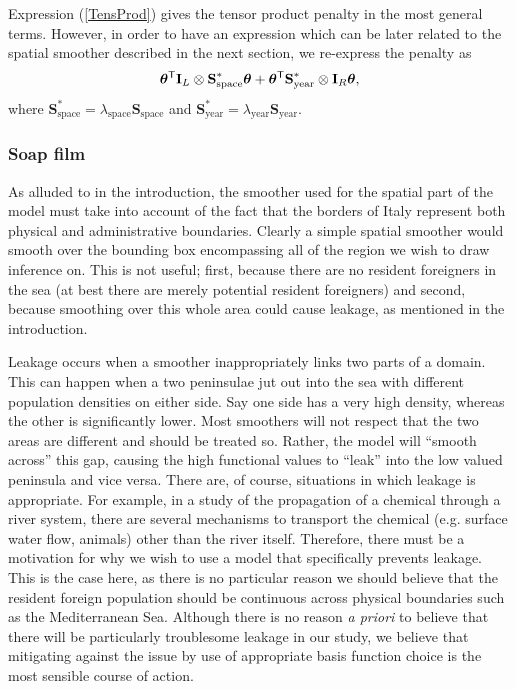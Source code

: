 \documentclass[12pt]{article}
\newcommand{\ts}{^{\sf T}}
\theoremstyle{definition}
\theoremstyle{plain}
\begin{document}
Expression (\ref{TensProd}) gives the tensor product penalty in the most general terms. However, in order to have an expression which can be later related to the spatial smoother described in the next section, we re-express the penalty as
$$
\bm\theta\ts \textbf{I}_L \otimes \textbf{S}^*_\text{space} \bm\theta + \bm\theta\ts \textbf{S}^*_\text{year} \otimes \textbf{I}_R  \bm\theta,
$$
where $\textbf{S}^*_\text{space}=\lambda_\text{space} \textbf{S}_\text{space}$ and $\textbf{S}^*_\text{year}=\lambda_\text{year} \textbf{S}_\text{year}$.


\subsubsection{Soap film \label{SF}}

As alluded to in the introduction, the smoother used for the spatial part of the model must take into account of the fact that the borders of Italy represent both physical and administrative boundaries. Clearly a simple spatial smoother would smooth over the bounding box encompassing all of the region we wish to draw inference on. This is not useful; first, because there are no resident foreigners in the sea (at best there are merely potential resident foreigners) and second, because smoothing over this whole area could cause leakage, as mentioned in the introduction.

Leakage occurs when a smoother inappropriately links two parts of a domain. This can happen when a two peninsulae jut out into the sea with different population densities on either side. Say one side has a very high density, whereas the other is significantly lower. Most smoothers will not respect that the two areas are different and should be treated so. Rather, the model will ``smooth across'' this gap, causing the high functional values to ``leak'' into the low valued peninsula and vice versa. There are, of course, situations in which leakage is appropriate. For example, in a study of the propagation of a chemical through a river system, there are several mechanisms to transport the chemical (e.g. surface water flow, animals) other than the river itself. Therefore, there must be a motivation for why we wish to use a model that specifically prevents leakage. This is the case here, as there is no particular reason we should believe that the resident foreign population should be continuous across physical boundaries such as the Mediterranean Sea. Although there is no reason \textit{a priori} to believe that there will be particularly troublesome leakage in our study, we believe that mitigating against the issue by use of appropriate basis function choice is the most sensible course of action. 
\end{document}
